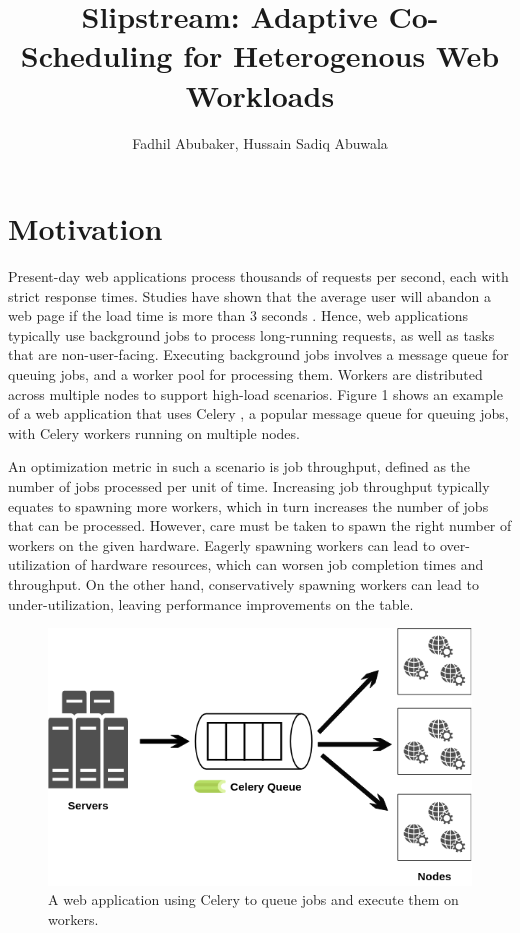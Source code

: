 \documentclass{proc}
\title{Slipstream: Adaptive Co-Scheduling for Heterogenous Web Workloads}
\author{Fadhil Abubaker, Hussain Sadiq Abuwala}
\date{}
\begin{document}
\maketitle

\section{Motivation}

Present-day web applications process thousands of requests per second, each with
strict response times. Studies have shown that the average user will abandon a
web page if the load time is more than 3 seconds \cite{Akamai}. Hence, web
applications typically use background jobs to process long-running requests, as
well as tasks that are non-user-facing. Executing background jobs involves a
message queue for queuing jobs, and a worker pool for processing them. Workers
are distributed across multiple nodes to support high-load scenarios. Figure 1
shows an example of a web application that uses Celery \cite{Celery}, a popular
message queue for queuing jobs, with Celery workers running on multiple nodes.

An optimization metric in such a scenario is job throughput, defined as the
number of jobs processed per unit of time. Increasing job throughput typically
equates to spawning more workers, which in turn increases the number of jobs
that can be processed. However, care must be taken to spawn the right number of
workers on the given hardware. Eagerly spawning workers can lead to
over-utilization of hardware resources, which can worsen job completion times
and throughput. On the other hand, conservatively spawning workers can lead to
under-utilization, leaving performance improvements on the table.

\begin{figure}
  \includegraphics[width=\linewidth]{celery-diagram.png}
  \caption{A web application using Celery to queue jobs and execute them on workers.}
\end{figure}
\end{document}
